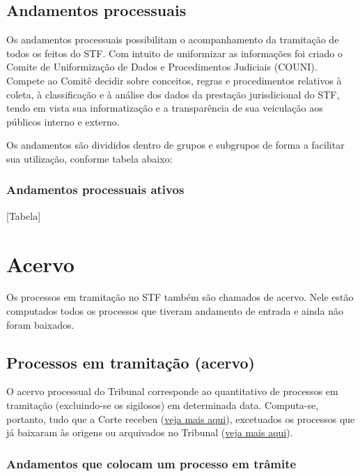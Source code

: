 \documentclass[
]{book}
\begin{document}
\hypertarget{andamentos-processuais}{%
\section{Andamentos processuais}\label{andamentos-processuais}}

Os andamentos processuais possibilitam o acompanhamento da tramitação de todos os feitos do STF. Com intuito de uniformizar as informações foi criado o Comite de Uniformização de Dados e Procedimentos Judiciais (COUNI). Compete ao Comitê decidir sobre conceitos, regras e procedimentos relativos à coleta, à classificação e à análise dos dados da prestação jurisdicional do STF, tendo em vista sua informatização e a transparência de sua veiculação aos públicos interno e externo.

Os andamentos são divididos dentro de grupos e subgrupos de forma a facilitar sua utilização, conforme tabela abaixo:

\hypertarget{andamentos-processuais-ativos}{%
\subsection{Andamentos processuais ativos}\label{andamentos-processuais-ativos}}

{[}Tabela{]}

\hypertarget{acervo}{%
\chapter{Acervo}\label{acervo}}

Os processos em tramitação no STF também são chamados de acervo. Nele estão computados todos os processos que tiveram andamento de entrada e ainda não foram baixados.

\hypertarget{processos-em-tramitauxe7uxe3o-acervo}{%
\section{Processos em tramitação (acervo)}\label{processos-em-tramitauxe7uxe3o-acervo}}

O acervo processual do Tribunal corresponde ao quantitativo de processos em tramitação (excluindo-se os sigilosos) em determinada data. Computa-se, portanto, tudo que a Corte recebeu (\protect\hyperlink{recebimento}{veja mais aqui}), excetuados os processos que já baixaram às origens ou arquivados no Tribunal (\protect\hyperlink{baixados}{veja mais aqui}).

\hypertarget{andamentos-que-colocam-um-processo-em-truxe2mite}{%
\subsection{Andamentos que colocam um processo em trâmite}\label{andamentos-que-colocam-um-processo-em-truxe2mite}}
\end{document}
